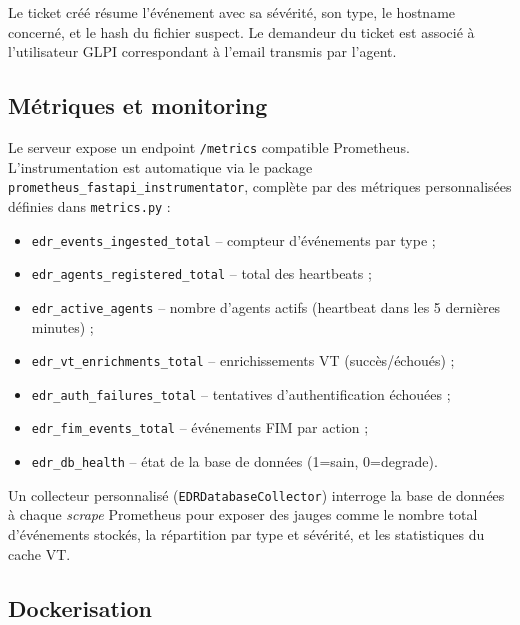 Le ticket créé résume l'événement avec sa sévérité, son type, le hostname
concerné, et le hash du fichier suspect. Le demandeur du ticket est
associé à l'utilisateur GLPI correspondant à l'email transmis par l'agent.

\subsection{Métriques et monitoring}

Le serveur expose un endpoint \texttt{/metrics} compatible Prometheus.
L'instrumentation est automatique via le package
\texttt{prometheus\_fastapi\_instrumentator}, complète par des métriques
personnalisées définies dans \texttt{metrics.py} :

\begin{itemize}
  \item \texttt{edr\_events\_ingested\_total} -- compteur d'événements
    par type ;
  \item \texttt{edr\_agents\_registered\_total} -- total des heartbeats ;
  \item \texttt{edr\_active\_agents} -- nombre d'agents actifs (heartbeat
    dans les 5 dernières minutes) ;
  \item \texttt{edr\_vt\_enrichments\_total} -- enrichissements VT
    (succès/échoués) ;
  \item \texttt{edr\_auth\_failures\_total} -- tentatives
    d'authentification échouées ;
  \item \texttt{edr\_fim\_events\_total} -- événements FIM par action ;
  \item \texttt{edr\_db\_health} -- état de la base de données
    (1=sain, 0=degrade).
\end{itemize}

Un collecteur personnalisé (\texttt{EDRDatabaseCollector}) interroge la
base de données à chaque \emph{scrape} Prometheus pour exposer des
jauges comme le nombre total d'événements stockés, la répartition par
type et sévérité, et les statistiques du cache VT.

\subsection{Dockerisation}

